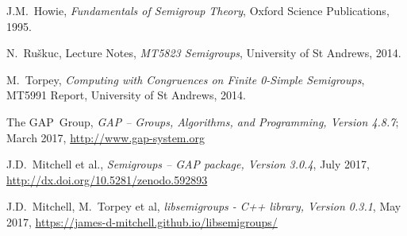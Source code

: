 \begin{thebibliography}{99}

  J.M.~Howie,
  \textit{Fundamentals of Semigroup Theory},
  Oxford Science Publications,
  1995.

  N.~Ru\v{s}kuc,
  Lecture Notes,
  \textit{MT5823 Semigroups},
  University of St Andrews,
  2014.

  M.~Torpey,
  \textit{Computing with Congruences on Finite 0-Simple Semigroups},
  MT5991 Report,
  University of St Andrews,
  2014.

  The GAP~Group, \emph{GAP -- Groups, Algorithms, and Programming,
  Version 4.8.7};
  March 2017,
  \url{http://www.gap-system.org}

  J.D.~Mitchell et al.,
  \textit{Semigroups -- GAP package, Version 3.0.4},
  July 2017,
  \url{http://dx.doi.org/10.5281/zenodo.592893}

  J.D.~Mitchell, M.~Torpey et al,
  \textit{libsemigroups - C++ library, Version 0.3.1},
  May 2017,
  \url{https://james-d-mitchell.github.io/libsemigroups/}

\end{thebibliography}
